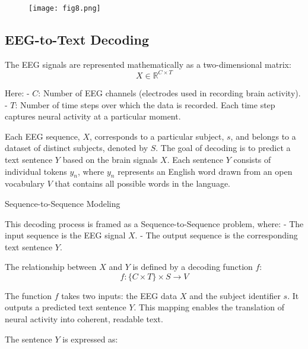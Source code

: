 \documentclass[journal]{IEEEtran}
\begin{document}
\begin{figure}[!h]
	\renewcommand{\arraystretch}{1.3}
	\centering
	\caption\normalsize{}
	\label{fig:dataset_content}
	\texttt{[image: fig8.png]}     \vspace{-10pt} %
\end{figure}

\subsection{EEG-to-Text Decoding}

The EEG signals are represented mathematically as a two-dimensional matrix:
\begin{equation}
	X \in \mathbb{R}^{C \times T}
\end{equation}

Here:
- \(C\): Number of EEG channels (electrodes used in recording brain activity).
- \(T\): Number of time steps over which the data is recorded. Each time step captures neural activity at a particular moment.

Each EEG sequence, \(X\), corresponds to a particular subject, \(s\), and belongs to a dataset of distinct subjects, denoted by \(S\). The goal of decoding is to predict a text sentence \(Y\) based on the brain signals \(X\). Each sentence \(Y\) consists of individual tokens \(y_n\), where \(y_n\) represents an English word drawn from an open vocabulary \(V\) that contains all possible words in the language.

Sequence-to-Sequence Modeling

This decoding process is framed as a Sequence-to-Sequence problem, where:
- The input sequence is the EEG signal \(X\).
- The output sequence is the corresponding text sentence \(Y\).

The relationship between \(X\) and \(Y\) is defined by a decoding function \(f\):
\begin{equation}
	f : \{C \times T\} \times S \rightarrow V
\end{equation}

The function \(f\) takes two inputs: the EEG data \(X\) and the subject identifier \(s\). It outputs a predicted text sentence \(Y\). This mapping enables the translation of neural activity into coherent, readable text.

The sentence \(Y\) is expressed as:
\end{document}
